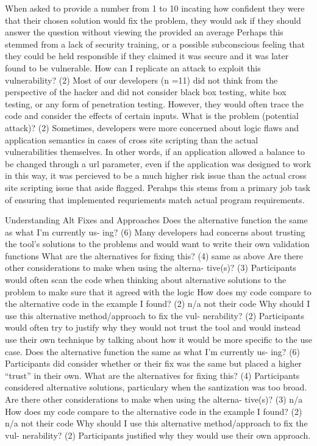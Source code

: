 \documentclass[twoside,letterpaper]{soups}
\begin{document}
 When asked to provide a number from 1 to 10 incating how confident they were that their chosen solution would fix the problem, they would ask if they should answer the question without viewing the  provided an average Perhaps this stemmed from a lack of security training, or a possible subconscious feeling that they could be held responsible if they claimed it was secure and it was later found to be vulnerable. 
How can I replicate an attack to exploit this vulnerability? (2)	Most of our developers (n =11)  did not think from the perspective of the hacker and did not consider black box testing, white box testing, or any form of penetration testing. However, they would often trace the code and consider the effects of certain inputs.
What is the problem (potential attack)? (2)		Sometimes, developers were more concerned about logic flaws and application semantics in cases of cross site scripting than the actual vulnerabilities themselves. In other words, if an application allowed a balance to be changed through a url parameter, even if the application was designed to work in this way, it was percieved to be a much higher risk issue than the actual cross site scripting issue that aside flagged.  Perahps this stems from a primary job task of ensuring that implemented requriements match actual program requirements. 


Understanding Alt Fixes and Approaches
Does the alternative function the same as what I’m currently us-
ing? (6) Many developers had concerns about trusting the tool's solutions to the problems and would want to write their own validation functions
What are the alternatives for fixing this? (4) same as above
Are there other considerations to make when using the alterna-
tive(s)? (3) Participants would often scan the code when thinking about alternative solutions to the problem to make sure that it agreed with the logic
How does my code compare to the alternative code in the example
I found? (2) n/a not their code
Why should I use this alternative method/approach to fix the vul-
nerability? (2) Participants would often try to justify why they would not trust the tool and would instead use their own technique by talking about how it would be more specific to the use case.
Does the alternative function the same as what I’m currently us-
ing? (6) Participants did consider whether or their fix was the same but placed a higher “trust” in their own.
What are the alternatives for fixing this? (4) Participants considered alternative solutions, particulary when the santization was too broad.
Are there other considerations to make when using the alterna-
tive(s)? (3) n/a
How does my code compare to the alternative code in the example
I found? (2) n/a not their code
Why should I use this alternative method/approach to fix the vul-
nerability? (2) Participants justified why they would use their own approach.
\end{document}
